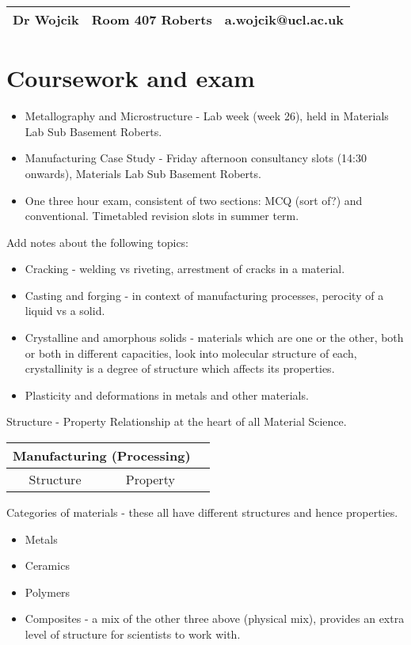 \begin{center}
  \begin{tabular}{ |c|c|c| }
    \hline
    Dr Wojcik & Room 407 Roberts & a.wojcik@ucl.ac.uk \\
    \hline
  \end{tabular}
\end{center}

\section{Coursework and exam}
\begin{itemize}
  \item Metallography and Microstructure - Lab week (week 26), held in Materials Lab Sub Basement Roberts.
  \item Manufacturing Case Study - Friday afternoon consultancy slots (14:30 onwards), Materials Lab Sub Basement Roberts.
  \item One three hour exam, consistent of two sections: MCQ (sort of?) and conventional. Timetabled revision slots in summer term.
\end{itemize}

Add notes about the following topics:
\begin{itemize}
  \item Cracking - welding vs riveting, arrestment of cracks in a material.
  \item Casting and forging - in context of manufacturing processes, perocity of a liquid vs a solid.
  \item Crystalline and amorphous solids -  materials which are one or the other, both or both in different capacities, look into molecular structure of each, crystallinity is a degree of structure which affects its properties.
  \item Plasticity and deformations in metals and other materials.
\end{itemize}

Structure - Property Relationship at the heart of all Material Science.
\begin{center}
  \begin{tabular}{ |c|c|c| }
    \hline
    \multicolumn{2}{|c|}{Manufacturing (Processing)} \\
    \hline
    Structure & Property                             \\
    \hline
  \end{tabular}
\end{center}

Categories of materials - these all have different structures and hence properties.
\begin{itemize}[noitemsep]
  \item Metals
  \item Ceramics
  \item Polymers
  \item Composites - a mix of the other three above (physical mix), provides an extra level of structure for scientists to work with.
\end{itemize}
